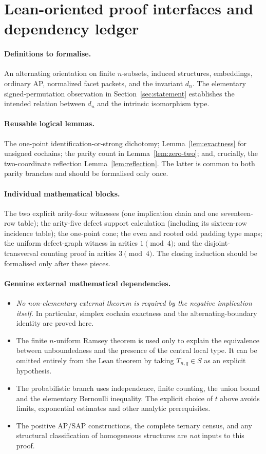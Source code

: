 \documentclass[11pt,a4paper]{article}
\theoremstyle{remark}
\begin{document}
\section{Lean-oriented proof interfaces and dependency ledger}
\label{app:lean}
\paragraph{Definitions to formalise.}
An alternating orientation on finite $n$-subsets, induced structures,
embeddings, ordinary AP, normalized facet packets, and the invariant
$d_n$. The elementary signed-permutation observation in
Section~\ref{sec:statement} establishes the intended relation
between $d_n$ and the intrinsic isomorphism type.

\paragraph{Reusable logical lemmas.}
The one-point identification-or-strong dichotomy;
Lemma~\ref{lem:exactness} for unsigned cochains;
the parity count in Lemma~\ref{lem:zero-two};
and, crucially, the two-coordinate reflection
Lemma~\ref{lem:reflection}. The latter is common to both parity
branches and should be formalised only once.

\paragraph{Individual mathematical blocks.}
The two explicit arity-four witnesses (one implication chain and
one seventeen-row table); the arity-five defect support calculation
(including its sixteen-row incidence table); the one-point cone;
the even and rooted odd padding type maps;
the uniform defect-graph witness in arities $1\pmod4$;
and the disjoint-transversal counting proof in arities $3\pmod4$.
The closing induction should be formalised only after these pieces.

\paragraph{Genuine external mathematical dependencies.}
\begin{itemize}
\item \emph{No non-elementary external theorem is required by the
negative implication itself.} In particular, simplex cochain
exactness and the alternating-boundary identity are proved here.
\item The finite $n$-uniform Ramsey theorem is used only to explain
the equivalence between unboundedness and the presence of the central
local type. It can be omitted entirely from the Lean theorem by
taking $T_{n,q}\in S$ as an explicit hypothesis.
\item The probabilistic branch uses independence, finite counting,
the union bound and the elementary Bernoulli inequality. The
explicit choice of $t$ above avoids limits, exponential estimates
and other analytic prerequisites.
\item The positive AP/SAP constructions, the complete ternary census,
and any structural classification of homogeneous structures are
\emph{not} inputs to this proof.
\end{itemize}
\end{document}
